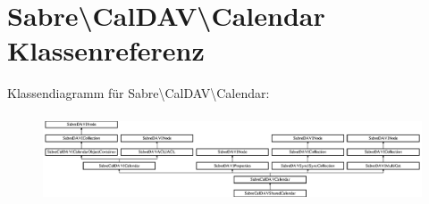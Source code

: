 \hypertarget{class_sabre_1_1_cal_d_a_v_1_1_calendar}{}\section{Sabre\textbackslash{}Cal\+D\+AV\textbackslash{}Calendar Klassenreferenz}
\label{class_sabre_1_1_cal_d_a_v_1_1_calendar}
Klassendiagramm für Sabre\textbackslash{}Cal\+D\+AV\textbackslash{}Calendar\+:\begin{figure}[H]
\begin{center}
\leavevmode
\includegraphics[height=2.635294cm]{class_sabre_1_1_cal_d_a_v_1_1_calendar}
\end{center}
\end{figure}
